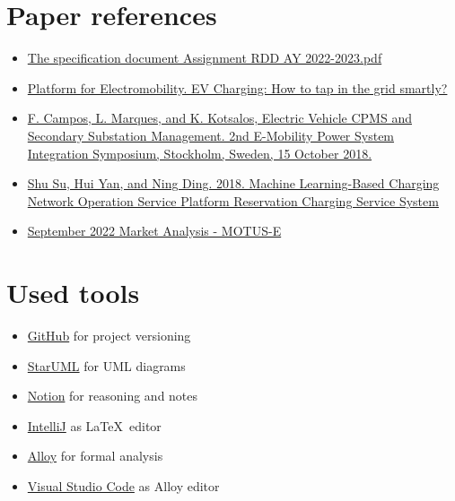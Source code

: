 \section{Paper references}
\label{sec:paper_references}%
\begin{itemize}
    \item \href{https://polimi365-my.sharepoint.com/:b:/g/personal/10685242_polimi_it/EWPABzzjfF9EsgYvSiuvdAIBAz6qnjdfLuPE8kwQSxeyCg?e=6qasKD}{The specification document Assignment RDD AY 2022-2023.pdf}
    \item \href{https://www.platformelectromobility.eu/2022/05/17/ev-charging-how-to-tap-in-the-grid-smartly/}{Platform for Electromobility. EV Charging: How to tap in the grid smartly?}
    \item \href{https://mobilityintegrationsymposium.org/wp-content/uploads/sites/10/2018/11/4A_3_Emob18_024_paper_Filipe_Campos.pdf}{F. Campos, L. Marques, and K. Kotsalos, Electric Vehicle CPMS and Secondary Substation Management. 2nd E-Mobility Power System Integration Symposium,  Stockholm,  Sweden,  15 October 2018. }
    \item \href{https://polimi365-my.sharepoint.com/:b:/g/personal/10685242_polimi_it/EfCXzQWCkK1Lsdtr4suEMp8B7YR3drdGqkArs7hnEx-bqA?e=xy1OTu}{Shu Su, Hui Yan, and Ning Ding. 2018. Machine Learning-Based Charging Network Operation Service Platform Reservation Charging Service System}
    \item \href{https://www.motus-e.org/analisi-di-mercato/settembre-2022-troppa-incertezza-consumatori-preoccupati-non-acquistano/}{September 2022 Market Analysis - MOTUS-E}
\end{itemize}


\section{Used tools}
\label{sec:used_tools}%
\begin{itemize}
    \item \href{https://github.com/}{GitHub} for project versioning
    \item \href{https://staruml.io/}{StarUML} for UML diagrams
    \item \href{https://www.notion.so/}{Notion} for reasoning and notes
    \item \href{https://www.jetbrains.com/idea/}{IntelliJ} as \LaTeX\ editor
    \item \href{https://alloytools.org/}{Alloy} for formal analysis
    \item \href{https://code.visualstudio.com/}{Visual Studio Code} as Alloy editor
\end{itemize}
